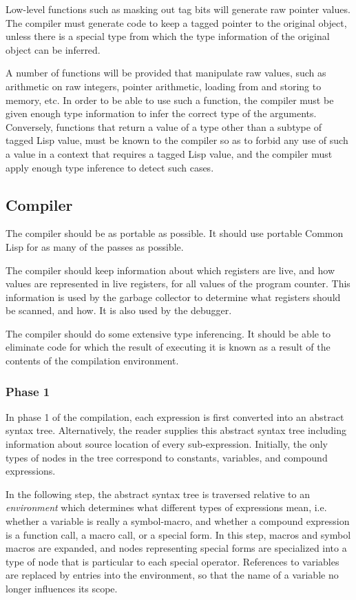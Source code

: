 \documentclass{article}
\begin{document}
Low-level functions such as masking out tag bits will generate raw
pointer values.  The compiler must generate code to keep a tagged
pointer to the original object, unless there is a special type from
which the type information of the original object can be inferred. 

A number of functions will be provided that manipulate raw values,
such as arithmetic on raw integers, pointer arithmetic, loading from
and storing to memory, etc.  In order to be able to use such a
function, the compiler must be given enough type information to infer
the correct type of the arguments.  Conversely, functions that return
a value of a type other than a subtype of tagged Lisp value, must be
known to the compiler so as to forbid any use of such a value in a
context that requires a tagged Lisp value, and the compiler must
apply enough type inference to detect such cases. 

\subsection{Compiler}

The compiler should be as portable as possible.  It should use
portable Common Lisp for as many of the passes as possible.  

The compiler should keep information about which registers are live,
and how values are represented in live registers, for all values of
the program counter.  This information is used by the garbage
collector to determine what registers should be scanned, and how.   It
is also used by the debugger.  

The compiler should do some extensive type inferencing.  It should be
able to eliminate code for which the result of executing it is known
as a result of the contents of the compilation environment.  

\subsubsection{Phase 1}

In phase 1 of the compilation, each expression is first converted into
an abstract syntax tree.  Alternatively, the reader supplies this
abstract syntax tree including information about source location of
every sub-expression.  Initially, the only types of nodes in the tree
correspond to constants, variables, and compound expressions.  

In the following step, the abstract syntax tree is traversed relative
to an \emph{environment} which determines what different types of
expressions mean, i.e. whether a variable is really a symbol-macro,
and whether a compound expression is a function call, a macro call, or
a special form.  In this step, macros and symbol macros are expanded,
and nodes representing special forms are specialized into a type of
node that is particular to each special operator.  References to
variables are replaced by entries into the environment, so that the
name of a variable no longer influences its scope. 
\end{document}
